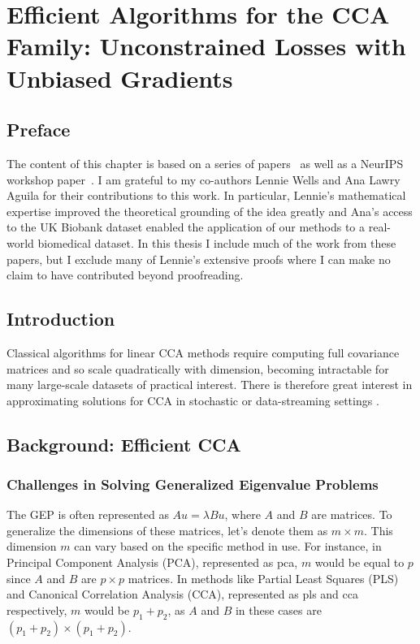 \graphicspath{{chapters/gradient_descent/}}


\chapter{Efficient Algorithms for the CCA Family: Unconstrained Losses with Unbiased Gradients}\label{ch:gradient_descent}
\minitoc
\section*{Preface}
The content of this chapter is based on a series of papers~\citep{chapman2022generalized, chapman2023efficient} as well as a NeurIPS workshop paper~\citep{chapman2023cca}.
I am grateful to my co-authors Lennie Wells and Ana Lawry Aguila for their contributions to this work.
In particular, Lennie's mathematical expertise improved the theoretical grounding of the idea greatly and Ana's access to the UK Biobank dataset enabled the application of our methods to a real-world biomedical dataset.
In this thesis I include much of the work from these papers, but I exclude many of Lennie's extensive proofs where I can make no claim to have contributed beyond proofreading.

\section{Introduction}

Classical algorithms for linear CCA methods require computing full covariance matrices and so scale quadratically with dimension, becoming intractable for many large-scale datasets of practical interest.
There is therefore great interest in approximating solutions for CCA in stochastic or data-streaming settings \citep{arora2012stochastic}.

\section{Background: Efficient CCA}\label{sec:background-unified}

\subsection{Challenges in Solving Generalized Eigenvalue Problems}

The GEP is often represented as \( Au = \lambda Bu \), where \( A \) and \( B \) are matrices. To generalize the dimensions of these matrices, let's denote them as \( m \times m \). This dimension \( m \) can vary based on the specific method in use. For instance, in Principal Component Analysis (PCA), represented as \acrshort{pca}, \( m \) would be equal to \( p \) since \( A \) and \( B \) are \( p \times p \) matrices. In methods like Partial Least Squares (PLS) and Canonical Correlation Analysis (CCA), represented as \acrshort{pls} and \acrshort{cca} respectively, \( m \) would be \( p_1+p_2 \), as \( A \) and \( B \) in these cases are \( (p_1+p_2) \times (p_1+p_2) \).

